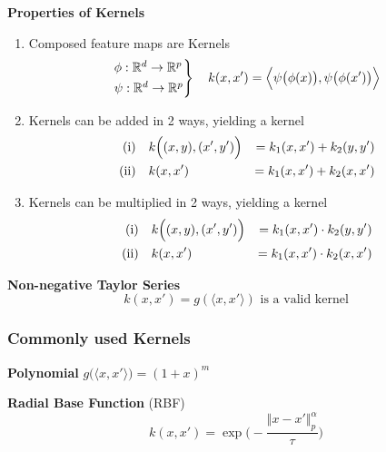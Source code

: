 \lemma \textbf{Properties of Kernels}
\begin{enumerate}
    \item Composed feature maps are Kernels
    $$
        \begin{rcases*}
            \phi: \R^d \to \R^p \\
            \psi: \R^d \to \R^p
        \end{rcases*}
        \quad k(x,x') = \Bigl\langle \psi\bigl( \phi(x) \bigr), \psi\bigl( \phi(x') \bigr) \Bigr\rangle
    $$
    \item Kernels can be added in 2 ways, yielding a kernel\\
    \begin{align*}
        \text{(i)}\quad     & k\Bigl( (x,y),(x',y') \Bigr)    &= k_1(x,x') + k_2(y,y') \\
        \text{(ii)}\quad    & k(x,x')                         &= k_1(x,x') + k_2(x,x')  
    \end{align*}
    \item Kernels can be multiplied in 2 ways, yielding a kernel\\
    \begin{align*}
        \text{(i)}\quad     & k\Bigl( (x,y),(x',y') \Bigr)    &= k_1(x,x') \cdot k_2(y,y') \\
        \text{(ii)}\quad    & k(x,x')                         &= k_1(x,x') \cdot k_2(x,x')  
    \end{align*}
\end{enumerate}

\lemma \textbf{Non-negative Taylor Series}\\
$$
    k(x,x') = g(\langle x,x' \rangle) \text{ is a valid kernel}
$$

\subsubsection{Commonly used Kernels}

 \textbf{Polynomial} $g\bigl(\langle x, x' \rangle\bigr) = (1+x)^m$\\

 \textbf{Radial Base Function} (RBF)\\
$$
    k(x,x') = \exp\biggl( -\frac{\Vert x-x'\Vert_p^\alpha}{\tau} \biggr)
$$

